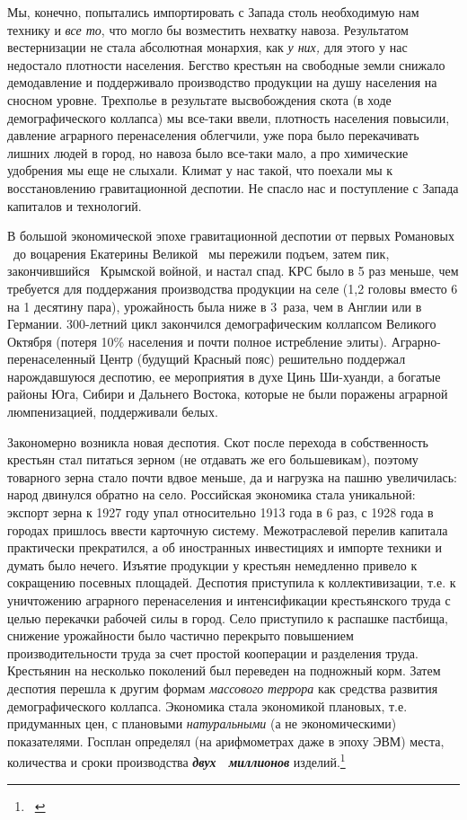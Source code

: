 \documentclass[twoside,a4paper]{article}
\begin{document}
{
Мы, конечно, попытались импортировать с Запада столь необходимую нам технику и \textit{все то}, что могло бы возместить
нехватку навоза. Результатом вестернизации не стала абсолютная монархия, как \textit{у них,} для этого у нас недостало
плотности населения. Бегство крестьян на свободные земли снижало демодавление и поддерживало производство продукции на
душу населения на сносном уровне. Трехполье в результате высвобождения скота (в ходе демографического коллапса) мы
все-таки ввели, плотность населения повысили, давление аграрного перенаселения облегчили, уже пора было перекачивать
лишних людей в город, но навоза было все-таки мало, а про химические удобрения мы еще не слыхали. Климат у нас такой,
что поехали мы к восстановлению гравитационной деспотии. Не спасло нас и поступление с Запада капиталов и технологий. }

{
В большой экономической эпохе гравитационной деспотии от первых Романовых \ до воцарения Екатерины Великой \textit{\ }мы
пережили подъем, затем пик, закончившийся \ Крымской войной, и настал спад. КРС было в 5 раз меньше, чем требуется для
поддержания производства продукции на селе (1,2 головы вместо 6 на 1 десятину пара), урожайность была ниже в 3~раза,
чем в Англии или в Германии. 300\nobreakdash-летний цикл закончился демографическим коллапсом Великого Октября (потеря
10\% населения и почти полное истребление элиты). Аграрно-перенаселенный Центр (будущий Красный пояс) решительно
поддержал нарождавшуюся деспотию, ее мероприятия в духе Цинь Ши-хуанди, а богатые районы Юга, Сибири и Дальнего
Востока, которые не были поражены аграрной люмпенизацией, поддерживали белых.}

{
Закономерно возникла новая деспотия. Скот после перехода в собственность крестьян стал питаться зерном (не отдавать же
его большевикам), поэтому товарного зерна стало почти вдвое меньше, да и нагрузка на пашню увеличилась: народ двинулся
обратно на село. Российская экономика стала уникальной: экспорт зерна к 1927 году упал относительно 1913 года в 6 раз,
с 1928 года в городах пришлось ввести карточную систему. Межотраслевой перелив капитала практически прекратился, а об
иностранных инвестициях и импорте техники и думать было нечего. Изъятие продукции у крестьян немедленно привело к
сокращению посевных площадей. Деспотия приступила к коллективизации, т.е. к уничтожению аграрного перенаселения и
интенсификации крестьянского труда с целью перекачки рабочей силы в город. Село приступило к распашке пастбища,
снижение урожайности было частично перекрыто повышением производительности труда за счет простой кооперации и
разделения труда. Крестьянин на несколько поколений был переведен на подножный корм. Затем деспотия перешла к другим
формам \textit{массового} \textit{террора }как средства развития демографического коллапса. Экономика стала экономикой
плановых, т.е. придуманных цен, с плановыми \textit{натуральными} (а не экономическими) показателями. Госплан определял
(на арифмометрах даже в эпоху ЭВМ) места, количества и сроки производства \textbf{\textit{двух \ миллионов}}
изделий.\footnote{\ } }
\end{document}

